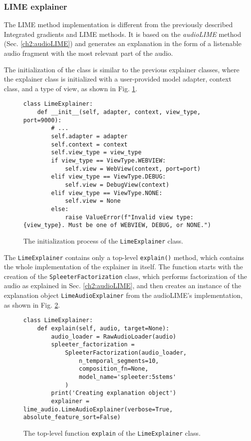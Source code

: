 \documentclass[
    bindingoffset=5mm,  %
    footnoteindent=3mm, %
    hyphenation=true    %
]{src/wut-thesis}
\begin{document}
\subsubsection{LIME explainer}

The LIME method implementation is different from the previously described Integrated gradients and
LIME methods. It is based on the \emph{audioLIME} method (Sec. \ref{ch2:audioLIME}) and generates
an explanation in the form of a listenable audio fragment with the most relevant part of the audio.

The initialization of the class is similar to the previous explainer classes, where the explainer
class is initialized with a user-provided model adapter, context class, and a type of view,
as shown in Fig. \ref{fig:LimeMethodInit}.

\begin{figure}[h!]
\begin{verbatim}
class LimeExplainer:
    def __init__(self, adapter, context, view_type, port=9000):
        # ...
        self.adapter = adapter
        self.context = context
        self.view_type = view_type
        if view_type == ViewType.WEBVIEW:
            self.view = WebView(context, port=port)
        elif view_type == ViewType.DEBUG:
            self.view = DebugView(context)
        elif view_type == ViewType.NONE:
            self.view = None
        else:
            raise ValueError(f"Invalid view type: {view_type}. Must be one of WEBVIEW, DEBUG, or NONE.")
\end{verbatim}
\caption{The initialization process of the \texttt{LimeExplainer} class.}
\label{fig:LimeMethodInit}
\end{figure}

The \texttt{LimeExplainer} contains only a top-level \texttt{explain()} method,
which contains the whole implementation of the explainer in itself. The function starts with the
creation of the \texttt{SpleeterFactorization} class, which performs factorization of the
audio as explained in Sec. \ref{ch2:audioLIME}, and then creates an instance of the explanation
object \texttt{LimeAudioExplainer} from the audioLIME’s implementation,
as shown in Fig. \ref{fig:LimeExplainMethod}.
 
\begin{figure}[h!]
\begin{verbatim}
class LimeExplainer:
    def explain(self, audio, target=None): 
        audio_loader = RawAudioLoader(audio)
        spleeter_factorization = 
            SpleeterFactorization(audio_loader,
                n_temporal_segments=10,
                composition_fn=None,
                model_name='spleeter:5stems'
            )
        print('Creating explanation object')
        explainer = lime_audio.LimeAudioExplainer(verbose=True, absolute_feature_sort=False)
\end{verbatim}
\caption{The top-level function \texttt{explain} of the \texttt{LimeExplainer} class.}
\label{fig:LimeExplainMethod}
\end{figure}
\end{document}
